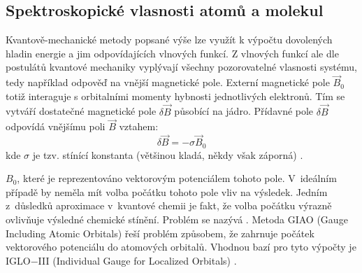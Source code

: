 \documentclass[
  digital, %
  table,   %
  lof,     %
  lot,     %
  oneside,
]{fithesis3}
\begin{document}
 \subsection{Spektroskopické vlasnosti atomů a molekul}
 Kvantově-mechanické metody popsané výše lze využít k výpočtu dovolených hladin energie a jim odpovídajících vlnových funkcí. Z vlnových funkcí ale dle postulátů kvantové mechaniky vyplývají všechny pozorovatelné vlasnosti systému, tedy například odpověď na vnější magnetické pole. Externí magnetické pole $\vec{B}_0$ totiž interaguje s orbitalními momenty hybnosti jednotlivých elektronů. Tím se vytváří dostatečné magnetické pole $\delta \vec{B}$ působící na jádro. Přídavné pole $\delta \vec{B}$ odpovídá vnějšímu poli $\vec{B}$ vztahem:
\begin{equation}
  \delta \vec{B} = - \sigma \vec{B}_0
\end{equation}
kde $\sigma$ je tzv. stínící konstanta (většinou kladá, někdy však záporná) \cite{atkins2010atkins}.

 $B_0$, které je reprezentováno vektorovým potenciálem tohoto pole. V~ideálním případě by neměla mít volba počátku tohoto pole vliv na výsledek. Jedním z~důsledků aproximace v~kvantové chemii je fakt, že volba počátku výrazně ovlivňuje výsledné chemické stínění. Problém se nazývá . Metoda GIAO (Gauge  Including Atomic Orbitals) řeší problém způsobem, že zahrnuje počátek vektorového potenciálu do atomových orbitalů. Vhodnou bazí pro tyto výpočty je IGLO$-$III \cite{Standara2006thesis} (Individual Gauge for Localized Orbitals) \cite{g09}.
\end{document}

